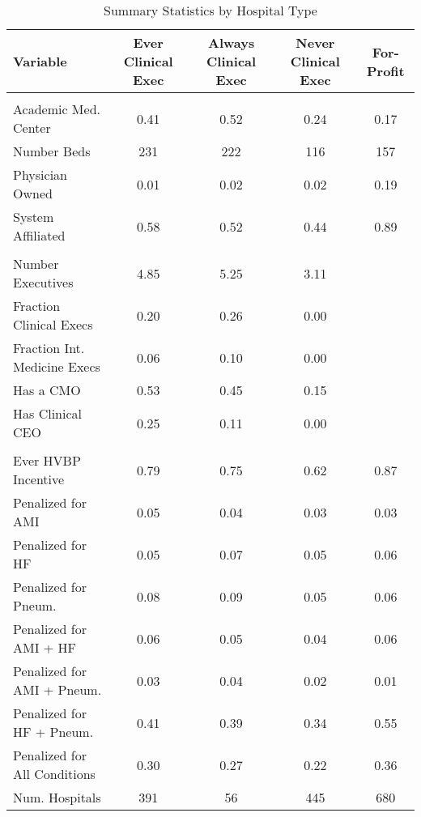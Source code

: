 \begin{table}[ht!]
\centering
\small
\caption{\label{tab:fp_samples_stable}Summary Statistics by Hospital Type}
\centering
\begin{tabular}[t]{lcccc}
\toprule
Variable & Ever Clinical Exec & Always Clinical Exec & Never Clinical Exec & For-Profit\\
\midrule
\addlinespace[0.3em]
\multicolumn{5}{l}{\textbf{Hospital Characteristics}}\\
\hspace{1em}Academic Med. Center & 0.41 & 0.52 & 0.24 & 0.17\\
\hspace{1em}Number Beds & 231 & 222 & 116 & 157\\
\hspace{1em}Physician Owned & 0.01 & 0.02 & 0.02 & 0.19\\
\hspace{1em}System Affiliated & 0.58 & 0.52 & 0.44 & 0.89\\
\addlinespace[0.3em]
\multicolumn{5}{l}{\textbf{Executive Team}}\\
\hspace{1em}Number Executives & 4.85 & 5.25 & 3.11 & \\
\hspace{1em}Fraction Clinical Execs & 0.20 & 0.26 & 0.00 & \\
\hspace{1em}Fraction Int. Medicine Execs & 0.06 & 0.10 & 0.00 & \\
\hspace{1em}Has a CMO & 0.53 & 0.45 & 0.15 & \\
\hspace{1em}Has Clinical CEO & 0.25 & 0.11 & 0.00 & \\
\addlinespace[0.3em]
\multicolumn{5}{l}{\textbf{Penalty/Payment Variables}}\\
\hspace{1em}Ever HVBP Incentive & 0.79 & 0.75 & 0.62 & 0.87\\
\hspace{1em}Penalized for AMI & 0.05 & 0.04 & 0.03 & 0.03\\
\hspace{1em}Penalized for HF & 0.05 & 0.07 & 0.05 & 0.06\\
\hspace{1em}Penalized for Pneum. & 0.08 & 0.09 & 0.05 & 0.06\\
\hspace{1em}Penalized for AMI + HF & 0.06 & 0.05 & 0.04 & 0.06\\
\hspace{1em}Penalized for AMI + Pneum. & 0.03 & 0.04 & 0.02 & 0.01\\
\hspace{1em}Penalized for HF + Pneum. & 0.41 & 0.39 & 0.34 & 0.55\\
\hspace{1em}Penalized for All Conditions & 0.30 & 0.27 & 0.22 & 0.36\\
Num. Hospitals & 391 & 56 & 445 & 680\\
\bottomrule
\end{tabular}
\end{table}

